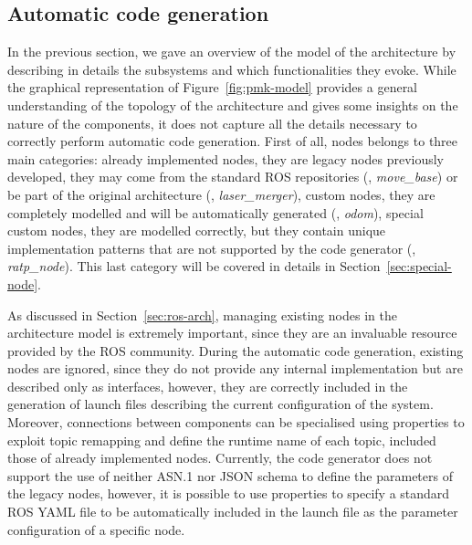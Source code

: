 \subsection{Automatic code generation}
In the previous section, we gave an overview of the model of the architecture by describing in details the subsystems and which functionalities they evoke. While the graphical representation of Figure~\ref{fig:pmk-model} provides a general understanding of the topology of the architecture and gives some insights on the nature of the components, it does not capture all the details necessary to correctly perform automatic code generation. First of all, nodes belongs to three main categories: already implemented nodes, they are legacy nodes previously developed, they may come from the standard ROS repositories (\eg, \textit{move\_base}) or be part of the original architecture (\eg, \textit{laser\_merger}), custom nodes, they are completely modelled and will be automatically generated (\eg, \textit{odom}), special custom nodes, they are modelled correctly, but they contain unique implementation patterns that are not supported by the code generator (\eg, \textit{ratp\_node}). This last category will be covered in details in Section~\ref{sec:special-node}. 

As discussed in Section~\ref{sec:ros-arch}, managing existing nodes in the architecture model is extremely important, since they are an invaluable resource provided by the ROS community. During the automatic code generation, existing nodes are ignored, since they do not provide any internal implementation but are described only as interfaces, however, they are correctly included in the generation of launch files describing the current configuration of the system. Moreover, connections between components can be specialised using properties to exploit topic remapping and define the runtime name of each topic, included those of already implemented nodes. Currently, the code generator does not support the use of neither ASN.1 nor JSON schema to define the parameters of the legacy nodes, however,  it is possible to use properties to specify a standard ROS YAML file to be automatically included in the launch file as the parameter configuration of a specific node.


